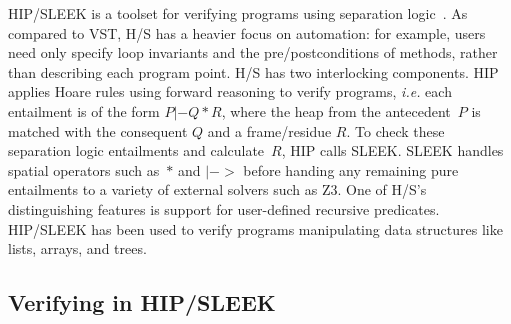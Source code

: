 HIP/SLEEK is a toolset for verifying programs using separation logic~\cite{chin:hipsleek}.  As compared to VST, H/S has a heavier focus on automation: for example, users need only specify loop invariants and the pre/postconditions of methods, rather than describing each program point.  H/S has two interlocking components.  HIP applies Hoare rules using forward reasoning to verify programs, \emph{i.e.} each entailment is of the form $P |- Q * R$, where the heap from the antecedent~$P$ is matched with the consequent $Q$ and a frame/residue $R$. To check these separation logic entailments and calculate~$R$, HIP calls SLEEK.  SLEEK handles spatial operators such as~$*$ and $|->$ before handing any remaining pure entailments to a variety of external solvers such as Z3.  One of H/S's distinguishing features is support for user-defined recursive predicates.  HIP/SLEEK has been used to verify programs manipulating data structures like lists, arrays, and trees.

\subsection{Verifying  in HIP/SLEEK}
\label{sec:hipsleekmark}

